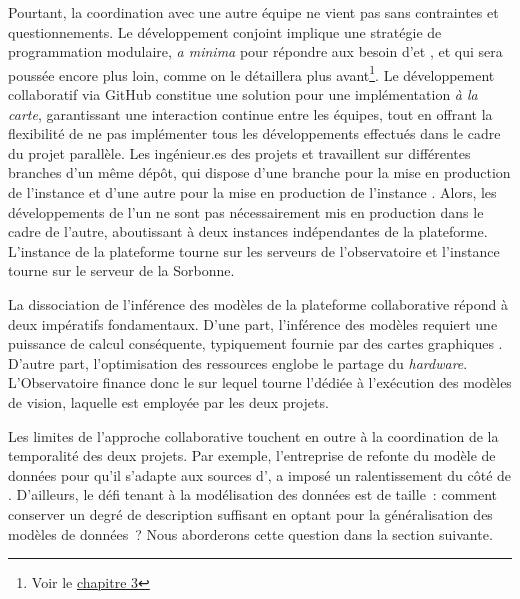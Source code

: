 Pourtant, la coordination avec une autre équipe ne vient pas sans
contraintes et questionnements. Le développement conjoint implique une
stratégie de programmation modulaire, \emph{a minima} pour répondre aux
besoin d'\eida et \vhs, et qui sera poussée encore plus loin, comme on le
détaillera plus avant\footnote{Voir le \hyperlink{chapitre-3-EDA-image-ia}{chapitre 3}}. Le
développement collaboratif via GitHub constitue une solution pour une
implémentation \emph{à la carte}, garantissant une interaction continue
entre les équipes, tout en offrant la flexibilité de ne pas implémenter
tous les développements effectués dans le cadre du projet parallèle. Les
ingénieur.es des projets \eida et \vhs travaillent sur différentes branches
d'un même dépôt, qui dispose d'une branche pour la mise en production de
l'instance \eida et d'une autre pour la mise en production de
l'instance \vhs. Alors, les développements de l'un ne sont pas
nécessairement mis en production dans le cadre de l'autre, aboutissant à
deux instances indépendantes de la plateforme. L'instance \eida de la plateforme tourne
sur les serveurs de l'observatoire et l'instance \vhs tourne sur le
serveur de la Sorbonne.

La dissociation de l'inférence des modèles de la plateforme
collaborative répond à deux impératifs fondamentaux. D'une part,
l'inférence des modèles requiert une puissance de calcul conséquente,
typiquement fournie par des cartes graphiques \gpu. D'autre part,
l'optimisation des ressources englobe le partage du \emph{hardware}.
L'Observatoire finance donc le \gpu sur lequel tourne l'\api dédiée à
l'exécution des modèles de vision, laquelle est employée par les deux
projets.

Les limites de l'approche collaborative touchent en outre à la
coordination de la temporalité des deux projets. Par exemple,
l'entreprise de refonte du modèle de données pour qu'il s'adapte aux
sources d'\eida, a imposé un ralentissement du côté de \vhs. D'ailleurs,
le défi tenant à la modélisation des données est de taille~: comment
conserver un degré de description suffisant en optant pour la
généralisation des modèles de données~? Nous aborderons cette question
dans la section suivante.

